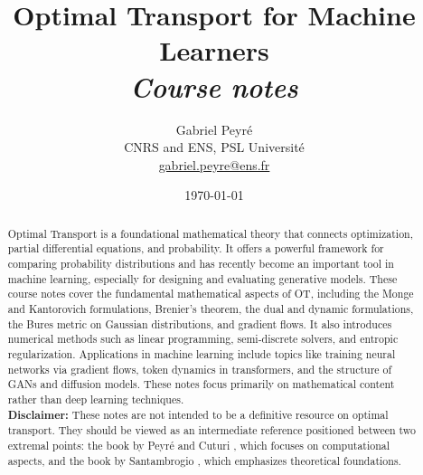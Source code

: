 \documentclass[10pt]{article}
\title{Optimal Transport for Machine Learners\\\textit{Course notes}}
\author{%
\begin{tabular}{c}
	Gabriel Peyr{\'e} \\ CNRS and ENS, PSL Universit\'e \\
	 \url{gabriel.peyre@ens.fr}
\end{tabular}
}
\date{\today}
\begin{document}
\maketitle

\begin{abstract}
Optimal Transport is a foundational mathematical theory that connects optimization, partial differential equations, and probability. It offers a powerful framework for comparing probability distributions and has recently become an important tool in machine learning, especially for designing and evaluating generative models. These course notes cover the fundamental mathematical aspects of OT, including the Monge and Kantorovich formulations, Brenier's theorem, the dual and dynamic formulations, the Bures metric on Gaussian distributions, and gradient flows. It also introduces numerical methods such as linear programming, semi-discrete solvers, and entropic regularization. Applications in machine learning include topics like training neural networks via gradient flows, token dynamics in transformers, and the structure of GANs and diffusion models. These notes focus primarily on mathematical content rather than deep learning techniques. \\
\noindent\textbf{Disclaimer:} These notes are not intended to be a definitive resource on optimal transport. They should be viewed as an intermediate reference positioned between two extremal points: the book by Peyr\'e and Cuturi \cite{peyre2019computational}, which focuses on computational aspects, and the book by Santambrogio \cite{SantambrogioBook}, which emphasizes theoretical foundations.
\end{abstract}
















\end{document}

